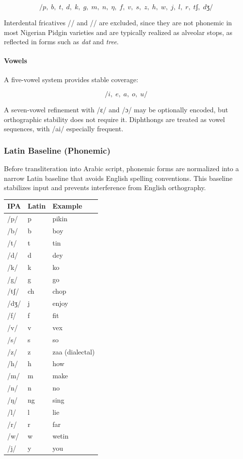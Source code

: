 \documentclass[12pt]{article}
\begin{document}
\[
/p,\; b,\; t,\; d,\; k,\; g,\;
m,\; n,\; \eta,\;
f,\; v,\; s,\; z,\; h,\;
w,\; j,\;
l,\; r,\;
tʃ,\; dʒ/
\]

Interdental fricatives /\texttheta/ and /\dh/ are excluded, since they are not phonemic in most Nigerian Pidgin varieties and are typically realized as alveolar stops, as reflected in forms such as \textit{dat} and \textit{tree}.

\paragraph{Vowels}

A five-vowel system provides stable coverage:

\[
/i,\; e,\; a,\; o,\; u/
\]

A seven-vowel refinement with /ɛ/ and /ɔ/ may be optionally encoded, but orthographic stability does not require it. Diphthongs are treated as vowel sequences, with /ai/ especially frequent.

\subsubsection{Latin Baseline (Phonemic)}

Before transliteration into Arabic script, phonemic forms are normalized into a narrow Latin baseline that avoids English spelling conventions. This baseline stabilizes input and prevents interference from English orthography.

\begin{center}
\begin{tabular}{lll}
IPA & Latin & Example \\
\hline
/p/ & p & pikin \\
/b/ & b & boy \\
/t/ & t & tin \\
/d/ & d & dey \\
/k/ & k & ko \\
/g/ & g & go \\
/tʃ/ & ch & chop \\
/dʒ/ & j & enjoy \\
/f/ & f & fit \\
/v/ & v & vex \\
/s/ & s & so \\
/z/ & z & zaa (dialectal) \\
/h/ & h & how \\
/m/ & m & make \\
/n/ & n & no \\
/ŋ/ & ng & sing \\
/l/ & l & lie \\
/r/ & r & far \\
/w/ & w & wetin \\
/j/ & y & you \\
\end{tabular}
\end{center}
\end{document}

